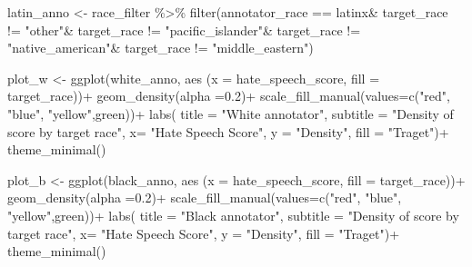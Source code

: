 \documentclass[
]{article}
\newenvironment{Shaded}{\begin{snugshade}}{\end{snugshade}}
\newcommand{\AttributeTok}[1]{\textcolor[rgb]{0.77,0.63,0.00}{#1}}
\newcommand{\FloatTok}[1]{\textcolor[rgb]{0.00,0.00,0.81}{#1}}
\newcommand{\FunctionTok}[1]{\textcolor[rgb]{0.00,0.00,0.00}{#1}}
\newcommand{\NormalTok}[1]{#1}
\newcommand{\OtherTok}[1]{\textcolor[rgb]{0.56,0.35,0.01}{#1}}
\newcommand{\SpecialCharTok}[1]{\textcolor[rgb]{0.00,0.00,0.00}{#1}}
\newcommand{\StringTok}[1]{\textcolor[rgb]{0.31,0.60,0.02}{#1}}
\begin{document}
\begin{Shaded}
\begin{Highlighting}[]
\NormalTok{latin\_anno }\OtherTok{\textless{}{-}}\NormalTok{ race\_filter }\SpecialCharTok{\%\textgreater{}\%} \FunctionTok{filter}\NormalTok{(annotator\_race }\SpecialCharTok{==} \StringTok{\textquotesingle{}latinx\textquotesingle{}}\SpecialCharTok{\&}
\NormalTok{                                       target\_race }\SpecialCharTok{!=} \StringTok{"other"}\SpecialCharTok{\&}
\NormalTok{                                       target\_race }\SpecialCharTok{!=} \StringTok{"pacific\_islander"}\SpecialCharTok{\&}
\NormalTok{                                       target\_race }\SpecialCharTok{!=} \StringTok{"native\_american"}\SpecialCharTok{\&}
\NormalTok{                                       target\_race }\SpecialCharTok{!=} \StringTok{"middle\_eastern"}\NormalTok{)}


\NormalTok{plot\_w }\OtherTok{\textless{}{-}} \FunctionTok{ggplot}\NormalTok{(white\_anno, }\FunctionTok{aes}\NormalTok{ (}\AttributeTok{x =}\NormalTok{ hate\_speech\_score, }\AttributeTok{fill =}\NormalTok{ target\_race))}\SpecialCharTok{+}
  \FunctionTok{geom\_density}\NormalTok{(}\AttributeTok{alpha =}\FloatTok{0.2}\NormalTok{)}\SpecialCharTok{+}
   \FunctionTok{scale\_fill\_manual}\NormalTok{(}\AttributeTok{values=}\FunctionTok{c}\NormalTok{(}\StringTok{"red"}\NormalTok{, }\StringTok{"blue"}\NormalTok{, }\StringTok{"yellow"}\NormalTok{,}\StringTok{\textquotesingle{}green\textquotesingle{}}\NormalTok{))}\SpecialCharTok{+}
  \FunctionTok{labs}\NormalTok{(}
    \AttributeTok{title =} \StringTok{"White annotator"}\NormalTok{, }
    \AttributeTok{subtitle =} \StringTok{"Density of score by target race"}\NormalTok{, }
    \AttributeTok{x=} \StringTok{"Hate Speech Score"}\NormalTok{, }
    \AttributeTok{y =} \StringTok{"Density"}\NormalTok{,}
    \AttributeTok{fill =} \StringTok{"Traget"}\NormalTok{)}\SpecialCharTok{+}
  \FunctionTok{theme\_minimal}\NormalTok{()}


\NormalTok{plot\_b }\OtherTok{\textless{}{-}} \FunctionTok{ggplot}\NormalTok{(black\_anno, }\FunctionTok{aes}\NormalTok{ (}\AttributeTok{x =}\NormalTok{ hate\_speech\_score, }\AttributeTok{fill =}\NormalTok{ target\_race))}\SpecialCharTok{+}
  \FunctionTok{geom\_density}\NormalTok{(}\AttributeTok{alpha =}\FloatTok{0.2}\NormalTok{)}\SpecialCharTok{+}
   \FunctionTok{scale\_fill\_manual}\NormalTok{(}\AttributeTok{values=}\FunctionTok{c}\NormalTok{(}\StringTok{"red"}\NormalTok{, }\StringTok{"blue"}\NormalTok{, }\StringTok{"yellow"}\NormalTok{,}\StringTok{\textquotesingle{}green\textquotesingle{}}\NormalTok{))}\SpecialCharTok{+}
  \FunctionTok{labs}\NormalTok{(}
    \AttributeTok{title =} \StringTok{"Black annotator"}\NormalTok{, }
    \AttributeTok{subtitle =} \StringTok{"Density of score by target race"}\NormalTok{, }
    \AttributeTok{x=} \StringTok{"Hate Speech Score"}\NormalTok{, }
    \AttributeTok{y =} \StringTok{"Density"}\NormalTok{,}
    \AttributeTok{fill =} \StringTok{"Traget"}\NormalTok{)}\SpecialCharTok{+}
  \FunctionTok{theme\_minimal}\NormalTok{()}


\end{Highlighting}
\end{Shaded}
\end{document}
